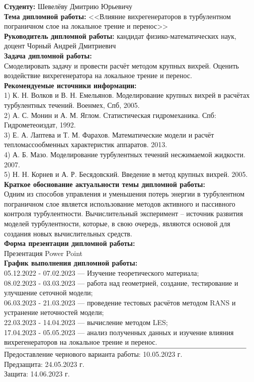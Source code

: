 \documentclass[a4paper]{extreport}
\begin{document}
	\begin{flushleft}
		\textbf{Студенту:} Шевелёву Дмитрию Юрьевичу\\
		\textbf{Тема дипломной работы:} <<Влияние вихрегенераторов в турбулентном пограничном слое на локальное трение и перенос>>\\
		\textbf{Руководитель дипломной работы:} кандидат физико-математических наук, доцент Чорный Андрей Дмитриевич\\
		\textbf{Задача дипломной работы:}\\
		Смоделировать задачу и провести расчёт методом крупных вихрей. Оценить воздействие вихрегенератора на локальное трение и перенос.\\ 
		\textbf{Рекомендуемые источники информации:}\\
		1) К. Н. Волков и В. Н. Емельянов. Моделирование крупных вихрей в расчётах турбулентных течений. Военмех, Спб, 2005.\\
		2) А. С. Монин и А. М. Яглом. Статистическая гидромеханика. Спб: Гидрометеоиздат, 1992.\\
		3) Е. А. Лаптева и Т. М. Фарахов. Математические модели и расчёт тепломассообменных характеристик аппаратов. 2013.\\
		4) А. Б. Мазо. Моделирование турбулентных течений несжимаемой жидкости. 2007.\\
		5) Н. Н. Корнев и А. Р. Бесядовский. Введение в метод крупных вихрей. 2005.\\
		\textbf{Краткое обоснование актуальности темы дипломной работы:}\\
		Одним из способов управления и уменьшения потерь энергии в турбулентном пограничном слое является использование методов активного и пассивного контроля турбулентности. Вычислительный эксперимент -- источник развития моделей турбулентности, которые, в свою очередь, являются основой для создания новых вычислительных средств.\\
		\textbf{Форма презентации дипломной работы:}\\
		Презентация Power Point\\
		\newpage
		\textbf{График выполнения дипломной работы:}\\
		05.12.2022 - 07.02.2023 --- Изучение теоретического материала;\\
		08.02.2023 - 03.03.2023 --- работа над геометрией, создание, тестирование и улучшение сеточной модели;\\
		06.03.2023 - 21.03.2023 --- проведение тестовых расчётов методом RANS и устранение неточностей модели;\\
		22.03.2023 - 14.04.2023 --- вычисление методом LES;\\
		17.04.2023 - 05.05.2023 --- анализ полученных данных и изучение влияния вихрегенераторов на локальное трение и перенос.\\
		$\underline{\hspace{\textwidth}}$
		Предоставление чернового варианта работы: 10.05.2023 г.\\
		Предзащита: 24.05.2023 г.\\
		Защита: 14.06.2023 г.\\
	\end{flushleft}
\end{document}
